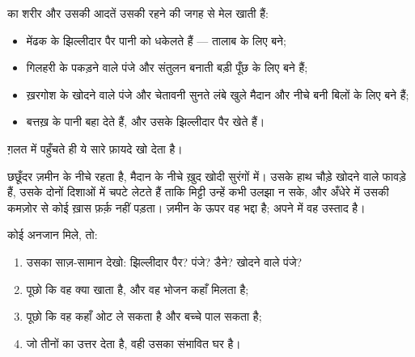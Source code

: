 \begin{proposition}[जंतु अपने आवास से मेल खाते हैं]\label{prop:g2:where-animals-live:fit}
 का शरीर और उसकी आदतें उसकी रहने की जगह से मेल खाती हैं:
\begin{itemize}
  \item मेंढक के झिल्लीदार पैर पानी को धकेलते हैं --- तालाब के लिए
        बने;
  \item गिलहरी के पकड़ने वाले पंजे और संतुलन बनाती बड़ी पूँछ  के
        लिए बने हैं;
  \item ख़रगोश के खोदने वाले पंजे और चेतावनी सुनते लंबे  खुले मैदान
        और नीचे बनी बिलों के लिए बने हैं;
  \item बत्तख़ के  पानी बहा देते हैं, और उसके झिल्लीदार पैर खेते
        हैं।
\end{itemize}
ग़लत  में पहुँचते ही  ये सारे फ़ायदे खो देता है।
\end{proposition}
\admitted

\begin{example}[छछूँदर का साज़-सामान]\label{ex:g2:where-animals-live:mole}
छछूँदर ज़मीन के नीचे रहता है, मैदान के नीचे ख़ुद खोदी सुरंगों में।
उसके हाथ चौड़े खोदने वाले फावड़े हैं, उसके  दोनों दिशाओं में चपटे
लेटते हैं ताकि मिट्टी उन्हें कभी उलझा न सके, और अँधेरे में उसकी कमज़ोर
 से कोई ख़ास फ़र्क़ नहीं पड़ता। ज़मीन के ऊपर वह भद्दा है; अपने
 में वह उस्ताद है।
\end{example}

\begin{method}[जंतु को उसके आवास से मिलाना]\label{met:g2:where-animals-live:matching}
कोई अनजान  मिले, तो:
\begin{enumerate}
  \item उसका साज़-सामान देखो: झिल्लीदार पैर? पंजे? डैने? खोदने वाले
        पंजे?
  \item पूछो कि वह क्या खाता है, और वह भोजन कहाँ मिलता है;
  \item पूछो कि वह कहाँ ओट ले सकता है और बच्चे पाल सकता है;
  \item जो  तीनों का उत्तर देता है, वही उसका संभावित घर है।
\end{enumerate}
\end{method}

